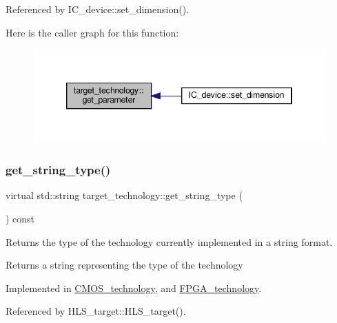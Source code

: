 Referenced by I\+C\+\_\+device\+::set\+\_\+dimension().

Here is the caller graph for this function\+:
\nopagebreak
\begin{figure}[H]
\begin{center}
\leavevmode
\includegraphics[width=346pt]{d8/d05/classtarget__technology_a92e316c35a7954c97093afe27e333e0b_icgraph}
\end{center}
\end{figure}
\mbox{\label{classtarget__technology_a53355954503841a8ead7a8dc9889af85}} 
\subsubsection{\texorpdfstring{get\+\_\+string\+\_\+type()}{get\_string\_type()}}
{\footnotesize\ttfamily virtual std\+::string target\+\_\+technology\+::get\+\_\+string\+\_\+type (\begin{DoxyParamCaption}{ }\end{DoxyParamCaption}) const\hspace{0.3cm}{\ttfamily [pure virtual]}}



Returns the type of the technology currently implemented in a string format. 

\begin{DoxyReturn}{Returns}
a string representing the type of the technology 
\end{DoxyReturn}


Implemented in \hyperlink{classCMOS__technology_a068946d67529fe475c1943b0450c4110}{C\+M\+O\+S\+\_\+technology}, and \hyperlink{classFPGA__technology_a991bb1b03178c5db7a77d008bfba2aa3}{F\+P\+G\+A\+\_\+technology}.



Referenced by H\+L\+S\+\_\+target\+::\+H\+L\+S\+\_\+target().

